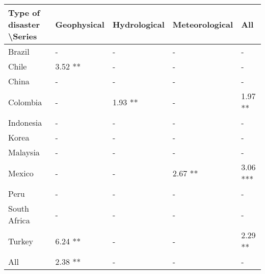 \begin{tabular}{lllll}
\hline
Type of disaster \textbackslash Series & Geophysical & Hydrological & Meteorological & All \\ \hline
Brazil & - & - & - & - \\
Chile & 3.52 ** & - & - & - \\
China & - & - & - & - \\
Colombia & - & 1.93 ** & - & 1.97 ** \\
Indonesia & - & - & - & - \\
Korea & - & - & - & - \\
Malaysia & - & - & - & - \\
Mexico & - & - & 2.67 ** & 3.06 *** \\
Peru & - & - & - & - \\
South Africa & - & - & - & - \\
Turkey & 6.24 ** & - & - & 2.29 ** \\
All & 2.38 ** & - & - & - \\ \hline
\end{tabular}
